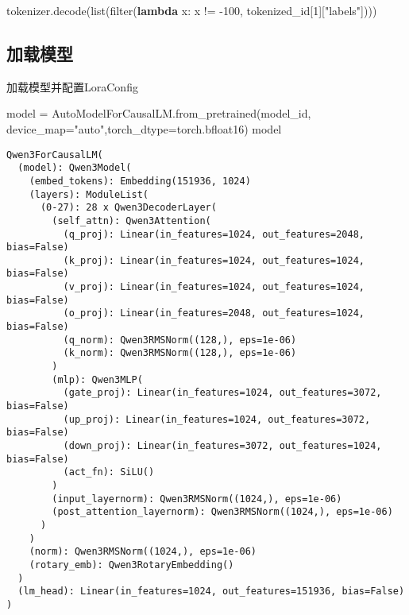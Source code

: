 \documentclass[
]{article}
\newenvironment{Shaded}{}{}
\newcommand{\BuiltInTok}[1]{\textcolor[rgb]{0.00,0.50,0.00}{#1}}
\newcommand{\DecValTok}[1]{\textcolor[rgb]{0.25,0.63,0.44}{#1}}
\newcommand{\KeywordTok}[1]{\textcolor[rgb]{0.00,0.44,0.13}{\textbf{#1}}}
\newcommand{\NormalTok}[1]{#1}
\newcommand{\OperatorTok}[1]{\textcolor[rgb]{0.40,0.40,0.40}{#1}}
\newcommand{\StringTok}[1]{\textcolor[rgb]{0.25,0.44,0.63}{#1}}
\begin{document}
\begin{Shaded}
\begin{Highlighting}[]
\NormalTok{tokenizer.decode(}\BuiltInTok{list}\NormalTok{(}\BuiltInTok{filter}\NormalTok{(}\KeywordTok{lambda}\NormalTok{ x: x }\OperatorTok{!=} \OperatorTok{{-}}\DecValTok{100}\NormalTok{, tokenized\_id[}\DecValTok{1}\NormalTok{][}\StringTok{"labels"}\NormalTok{])))}
\end{Highlighting}
\end{Shaded}

\subsection{加载模型}\label{ux52a0ux8f7dux6a21ux578b}

加载模型并配置LoraConfig

\begin{Shaded}
\begin{Highlighting}[]
\NormalTok{model }\OperatorTok{=}\NormalTok{ AutoModelForCausalLM.from\_pretrained(model\_id, device\_map}\OperatorTok{=}\StringTok{"auto"}\NormalTok{,torch\_dtype}\OperatorTok{=}\NormalTok{torch.bfloat16)}
\NormalTok{model}
\end{Highlighting}
\end{Shaded}

\begin{verbatim}
Qwen3ForCausalLM(
  (model): Qwen3Model(
    (embed_tokens): Embedding(151936, 1024)
    (layers): ModuleList(
      (0-27): 28 x Qwen3DecoderLayer(
        (self_attn): Qwen3Attention(
          (q_proj): Linear(in_features=1024, out_features=2048, bias=False)
          (k_proj): Linear(in_features=1024, out_features=1024, bias=False)
          (v_proj): Linear(in_features=1024, out_features=1024, bias=False)
          (o_proj): Linear(in_features=2048, out_features=1024, bias=False)
          (q_norm): Qwen3RMSNorm((128,), eps=1e-06)
          (k_norm): Qwen3RMSNorm((128,), eps=1e-06)
        )
        (mlp): Qwen3MLP(
          (gate_proj): Linear(in_features=1024, out_features=3072, bias=False)
          (up_proj): Linear(in_features=1024, out_features=3072, bias=False)
          (down_proj): Linear(in_features=3072, out_features=1024, bias=False)
          (act_fn): SiLU()
        )
        (input_layernorm): Qwen3RMSNorm((1024,), eps=1e-06)
        (post_attention_layernorm): Qwen3RMSNorm((1024,), eps=1e-06)
      )
    )
    (norm): Qwen3RMSNorm((1024,), eps=1e-06)
    (rotary_emb): Qwen3RotaryEmbedding()
  )
  (lm_head): Linear(in_features=1024, out_features=151936, bias=False)
)
\end{verbatim}
\end{document}
